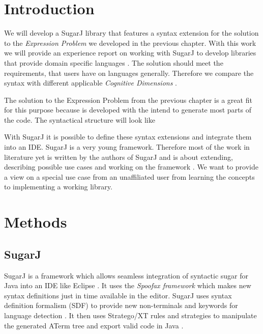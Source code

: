 \documentclass{report}
\begin{document}
\section{Introduction}

We will develop a SugarJ library that features a syntax extension for the solution to the \emph{Expression Problem} we developed in the previous chapter. With this work we will provide an experience report on working with SugarJ to develop libraries that provide domain specific languages \cite{Erdweg-SugarJ-2011}. The solution should meet the requirements, that users have on languages generally. Therefore we compare the syntax with different applicable \emph{Cognitive Dimensions} \cite{Green-Cognitive-1996}.

The solution to the Expression Problem from the previous chapter is a great fit for this purpose because is developed with the intend to generate most parts of the code. The syntactical structure will look like

With SugarJ it is possible to define these syntax extensions and integrate them into an IDE. SugarJ is a very young framework. Therefore most of the work in literature yet is written by the authors of SugarJ and is about extending, describing possible use cases and working on the framework \cite{Fehrenbach-Retrofitting-2011, Erdweg-Composition-2012, Erdweg-Editor-2011, Erdweg-SugarHaskell-2012, Erdweg-Questionnaire-2013}. We want to provide a view on a special use case from an unaffiliated user from learning the concepts to implementing a working library.


\section{Methods}

\subsection{SugarJ}

SugarJ is a framework which allows seamless integration of syntactic sugar for Java into an IDE like Eclipse \cite{Erdweg-SugarJ-2011}. It uses the \emph{Spoofax framework} which makes new syntax definitions just in time available in the editor. SugarJ uses syntax definition formalism (SDF) to provide new non-terminals and keywords for language detection \cite{Heering-SDF-1989}. It then uses Stratego/XT rules and strategies to manipulate the generated ATerm tree and export valid code in Java \cite{Kats-Spoofax-2010, Brand-ATerms-2000}.
\end{document}
